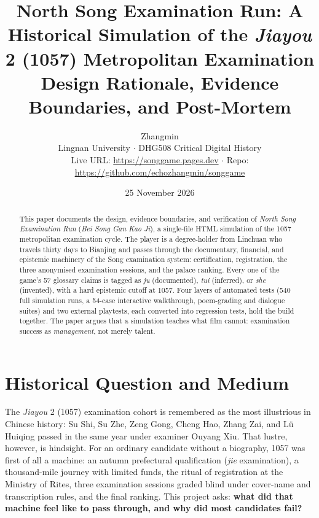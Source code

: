 \documentclass[12pt,a4paper]{article}
\title{\textbf{North Song Examination Run: A Historical Simulation of the \emph{Jiayou} 2 (1057) Metropolitan Examination}\\[0.3em]
\large Design Rationale, Evidence Boundaries, and Post-Mortem}
\author{Zhangmin\\Lingnan University $\cdot$ DHG508 Critical Digital History\\
\small Live URL: \url{https://songgame.pages.dev} $\cdot$ Repo: \url{https://github.com/echozhangmin/songgame}}
\date{25 November 2026}
\begin{document}
\maketitle

\begin{abstract}
\noindent
This paper documents the design, evidence boundaries, and verification of
\emph{North Song Examination Run} (\emph{Bei Song Gan Kao Ji}), a single-file
HTML simulation of the 1057 metropolitan examination cycle. The player is a
degree-holder from Linchuan who travels thirty days to Bianjing and passes
through the documentary, financial, and epistemic machinery of the Song
examination system: certification, registration, the three anonymised
examination sessions, and the palace ranking. Every one of the game's 57
glossary claims is tagged as \emph{ju} (documented), \emph{tui} (inferred), or
\emph{she} (invented), with a hard epistemic cutoff at 1057. Four layers of
automated tests (540 full simulation runs, a 54-case interactive walkthrough,
poem-grading and dialogue suites) and two external playtests, each converted
into regression tests, hold the build together. The paper argues that a
simulation teaches what film cannot: examination success as \emph{management},
not merely talent.
\end{abstract}

\onehalfspacing

\section{Historical Question and Medium}

The \emph{Jiayou} 2 (1057) examination cohort is remembered as the most
illustrious in Chinese history: Su Shi, Su Zhe, Zeng Gong, Cheng Hao, Zhang
Zai, and L\"{u} Huiqing passed in the same year under examiner Ouyang Xiu.
That lustre, however, is hindsight. For an ordinary candidate without a
biography, 1057 was first of all a machine: an autumn prefectural
qualification (\emph{jie} examination), a thousand-mile journey with limited
funds, the ritual of registration at the Ministry of Rites, three examination
sessions graded blind under cover-name and transcription rules, and the
final ranking. This project asks: \textbf{what did that machine feel like to
pass through, and why did most candidates fail?}
\end{document}
